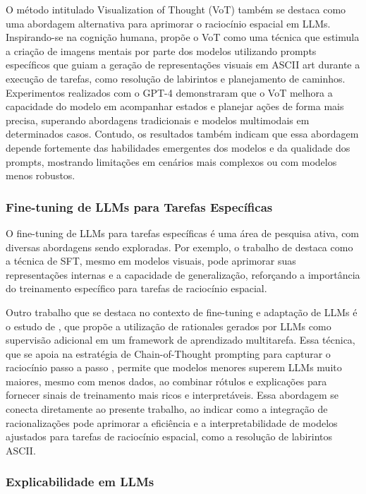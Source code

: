 O método intitulado Visualization of Thought (VoT) também se destaca como uma abordagem alternativa para aprimorar o raciocínio espacial em LLMs. Inspirando-se na cognição humana, \cite{wu2024mind} propõe o VoT como uma técnica que estimula a criação de imagens mentais por parte dos modelos utilizando prompts específicos que guiam a geração de representações visuais em ASCII art durante a execução de tarefas, como resolução de labirintos e planejamento de caminhos. Experimentos realizados com o GPT-4 demonstraram que o VoT melhora a capacidade do modelo em acompanhar estados e planejar ações de forma mais precisa, superando abordagens tradicionais e modelos multimodais em determinados casos. Contudo, os resultados também indicam que essa abordagem depende fortemente das habilidades emergentes dos modelos e da qualidade dos prompts, mostrando limitações em cenários mais complexos ou com modelos menos robustos.

\subsubsection{Fine-tuning de LLMs para Tarefas Específicas}

O fine-tuning de LLMs para tarefas específicas é uma área de pesquisa ativa, com diversas abordagens sendo exploradas. Por exemplo, o trabalho de \cite{wang2024picture} destaca como a técnica de SFT, mesmo em modelos visuais, pode aprimorar suas representações internas e a capacidade de generalização, reforçando a importância do treinamento específico para tarefas de raciocínio espacial. 

Outro trabalho que se destaca no contexto de fine-tuning e adaptação de LLMs é o estudo de \cite{hsieh2023distillingstepbystep}, que propõe a utilização de rationales gerados por LLMs como supervisão adicional em um framework de aprendizado multitarefa. Essa técnica, que se apoia na estratégia de Chain-of-Thought prompting para capturar o raciocínio passo a passo \cite{wei2023chainofthought}, permite que modelos menores superem LLMs muito maiores, mesmo com menos dados, ao combinar rótulos e explicações para fornecer sinais de treinamento mais ricos e interpretáveis. Essa abordagem se conecta diretamente ao presente trabalho, ao indicar como a integração de racionalizações pode aprimorar a eficiência e a interpretabilidade de modelos ajustados para tarefas de raciocínio espacial, como a resolução de labirintos ASCII.

\subsubsection{Explicabilidade em LLMs}

